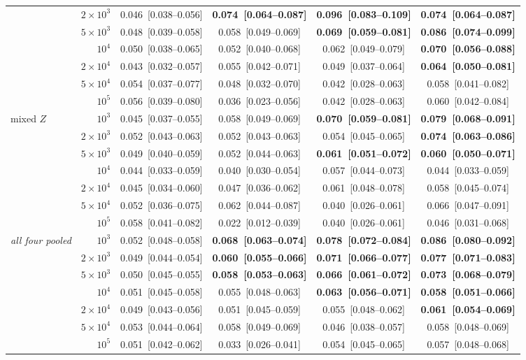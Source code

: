 {\begin{tabular}{lrcccc}
 & $2\times10^3$ & 0.046~[0.038--0.056] & \textbf{0.074~[0.064--0.087]} & \textbf{0.096~[0.083--0.109]} & \textbf{0.074~[0.064--0.087]} \\
 & $5\times10^3$ & 0.048~[0.039--0.058] & 0.058~[0.049--0.069] & \textbf{0.069~[0.059--0.081]} & \textbf{0.086~[0.074--0.099]} \\
 & $10^4$ & 0.050~[0.038--0.065] & 0.052~[0.040--0.068] & 0.062~[0.049--0.079] & \textbf{0.070~[0.056--0.088]} \\
 & $2\times10^4$ & 0.043~[0.032--0.057] & 0.055~[0.042--0.071] & 0.049~[0.037--0.064] & \textbf{0.064~[0.050--0.081]} \\
 & $5\times10^4$ & 0.054~[0.037--0.077] & 0.048~[0.032--0.070] & 0.042~[0.028--0.063] & 0.058~[0.041--0.082] \\
 & $10^5$ & 0.056~[0.039--0.080] & 0.036~[0.023--0.056] & 0.042~[0.028--0.063] & 0.060~[0.042--0.084] \\
\midrule
mixed $Z$ & $10^3$ & 0.045~[0.037--0.055] & 0.058~[0.049--0.069] & \textbf{0.070~[0.059--0.081]} & \textbf{0.079~[0.068--0.091]} \\
 & $2\times10^3$ & 0.052~[0.043--0.063] & 0.052~[0.043--0.063] & 0.054~[0.045--0.065] & \textbf{0.074~[0.063--0.086]} \\
 & $5\times10^3$ & 0.049~[0.040--0.059] & 0.052~[0.044--0.063] & \textbf{0.061~[0.051--0.072]} & \textbf{0.060~[0.050--0.071]} \\
 & $10^4$ & 0.044~[0.033--0.059] & 0.040~[0.030--0.054] & 0.057~[0.044--0.073] & 0.044~[0.033--0.059] \\
 & $2\times10^4$ & 0.045~[0.034--0.060] & 0.047~[0.036--0.062] & 0.061~[0.048--0.078] & 0.058~[0.045--0.074] \\
 & $5\times10^4$ & 0.052~[0.036--0.075] & 0.062~[0.044--0.087] & 0.040~[0.026--0.061] & 0.066~[0.047--0.091] \\
 & $10^5$ & 0.058~[0.041--0.082] & 0.022~[0.012--0.039] & 0.040~[0.026--0.061] & 0.046~[0.031--0.068] \\
\midrule
\emph{all four pooled} & $10^3$ & 0.052~[0.048--0.058] & \textbf{0.068~[0.063--0.074]} & \textbf{0.078~[0.072--0.084]} & \textbf{0.086~[0.080--0.092]} \\
 & $2\times10^3$ & 0.049~[0.044--0.054] & \textbf{0.060~[0.055--0.066]} & \textbf{0.071~[0.066--0.077]} & \textbf{0.077~[0.071--0.083]} \\
 & $5\times10^3$ & 0.050~[0.045--0.055] & \textbf{0.058~[0.053--0.063]} & \textbf{0.066~[0.061--0.072]} & \textbf{0.073~[0.068--0.079]} \\
 & $10^4$ & 0.051~[0.045--0.058] & 0.055~[0.048--0.063] & \textbf{0.063~[0.056--0.071]} & \textbf{0.058~[0.051--0.066]} \\
 & $2\times10^4$ & 0.049~[0.043--0.056] & 0.051~[0.045--0.059] & 0.055~[0.048--0.062] & \textbf{0.061~[0.054--0.069]} \\
 & $5\times10^4$ & 0.053~[0.044--0.064] & 0.058~[0.049--0.069] & 0.046~[0.038--0.057] & 0.058~[0.048--0.069] \\
 & $10^5$ & 0.051~[0.042--0.062] & 0.033~[0.026--0.041] & 0.054~[0.045--0.065] & 0.057~[0.048--0.068] \\
\bottomrule
\end{tabular}}

